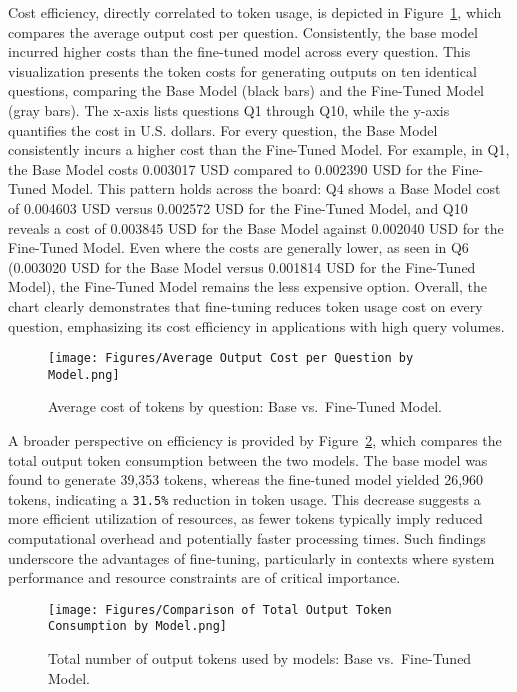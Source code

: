 \documentclass[12pt,oneside,openany]{report}
\begin{document}
Cost efficiency, directly correlated to token usage, is depicted in Figure~\ref{fig:avg-cost-by-question}, which compares the average output cost per question. Consistently, the base model incurred higher costs than the fine-tuned model across every question. This visualization presents the token costs for generating outputs on ten identical questions, comparing the Base Model (black bars) and the Fine-Tuned Model (gray bars). The x-axis lists questions Q1 through Q10, while the y-axis quantifies the cost in U.S. dollars. For every question, the Base Model consistently incurs a higher cost than the Fine-Tuned Model. For example, in Q1, the Base Model costs 0.003017 USD compared to 0.002390 USD for the Fine-Tuned Model. This pattern holds across the board: Q4 shows a Base Model cost of 0.004603 USD versus 0.002572 USD for the Fine-Tuned Model, and Q10 reveals a cost of 0.003845 USD for the Base Model against 0.002040 USD for the Fine-Tuned Model. Even where the costs are generally lower, as seen in Q6 (0.003020 USD for the Base Model versus 0.001814 USD for the Fine-Tuned Model), the Fine-Tuned Model remains the less expensive option. Overall, the chart clearly demonstrates that fine-tuning reduces token usage cost on every question, emphasizing its cost efficiency in applications with high query volumes.

\begin{figure}[H]
    \centering
    \texttt{[image: Figures/Average Output Cost per Question by Model.png]}
    \caption{Average cost of tokens by question: Base vs.\ Fine-Tuned Model.}
    \label{fig:avg-cost-by-question}
\end{figure}

A broader perspective on efficiency is provided by Figure~\ref{fig:total-tokens-by-model}, which compares the total output token consumption between the two models. The base model was found to generate 39,353 tokens, whereas the fine-tuned model yielded 26,960 tokens, indicating a \verb|31.5%| reduction in token usage. This decrease suggests a more efficient utilization of resources, as fewer tokens typically imply reduced computational overhead and potentially faster processing times. Such findings underscore the advantages of fine-tuning, particularly in contexts where system performance and resource constraints are of critical importance.


\begin{figure}[H]
    \centering
    \texttt{[image: Figures/Comparison of Total Output Token Consumption by Model.png]}
    \caption{Total number of output tokens used by models: Base vs.\ Fine-Tuned Model.}
    \label{fig:total-tokens-by-model}
\end{figure}
\end{document}
